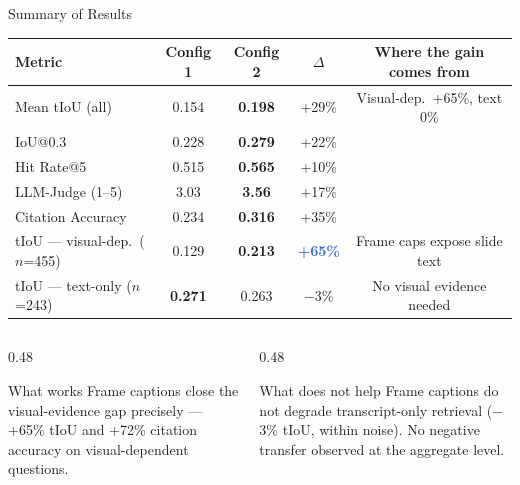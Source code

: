 \documentclass[aspectratio=169,t]{beamer}
\begin{document}
\begin{frame}{Summary of Results}

\begin{center}
\small
\begin{tabular}{lcccc}
\toprule
Metric & Config 1 & Config 2 & $\Delta$ & Where the gain comes from \\
\midrule
Mean tIoU (all)         & 0.154 & \textbf{0.198} & +29\% & Visual-dep.\ +65\%, text 0\% \\
IoU@0.3                 & 0.228 & \textbf{0.279} & +22\% & \\
Hit Rate@5              & 0.515 & \textbf{0.565} & +10\% & \\
LLM-Judge (1--5)        & 3.03  & \textbf{3.56}  & +17\% & \\
Citation Accuracy       & 0.234 & \textbf{0.316} & +35\% & \\
\midrule
tIoU — visual-dep.\ ($n$=455)  & 0.129 & \textbf{0.213} & \textcolor{highlight}{\textbf{+65\%}} & Frame caps expose slide text \\
tIoU — text-only ($n$=243)     & \textbf{0.271} & 0.263 & $-$3\% & No visual evidence needed \\
\bottomrule
\end{tabular}
\end{center}

\medskip
\begin{columns}[T]
\begin{column}{0.48\textwidth}
  \begin{exampleblock}{What works}
    Frame captions close the visual-evidence gap precisely — +65\% tIoU and +72\%
    citation accuracy on visual-dependent questions.
  \end{exampleblock}
\end{column}
\begin{column}{0.48\textwidth}
  \begin{alertblock}{What does not help}
    Frame captions do not degrade transcript-only retrieval ($-$3\% tIoU,
    within noise). No negative transfer observed at the aggregate level.
  \end{alertblock}
\end{column}
\end{columns}

\end{frame}
\end{document}
